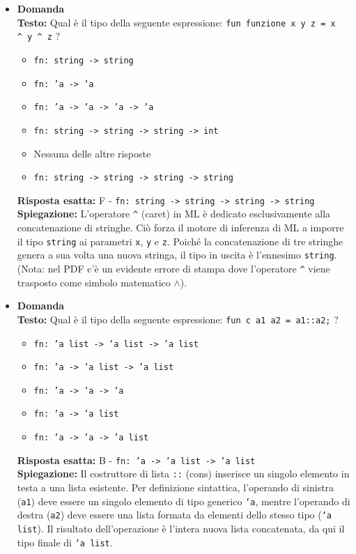 \documentclass[12pt, a4paper]{article}
\newcounter{domandateoria}
\begin{document}
\begin{itemize}
\newpage

    \item {}\textbf{Domanda \thedomandateoria} \\
    \textbf{Testo:} Qual è il tipo della seguente espressione: \texttt{fun funzione x y z = x \textasciicircum\ y \textasciicircum\ z} ?
    \begin{itemize}
        \item[A)] \texttt{fn: string -> string}
        \item[B)] \texttt{fn: 'a -> 'a}
        \item[C)] \texttt{fn: 'a -> 'a -> 'a -> 'a}
        \item[D)] \texttt{fn: string -> string -> string -> int}
        \item[E)] Nessuna delle altre risposte
        \item[F)] \texttt{fn: string -> string -> string -> string}
    \end{itemize}
    \textbf{Risposta esatta:} F - \texttt{fn: string -> string -> string -> string} \\
    \textbf{Spiegazione:} L'operatore \texttt{\textasciicircum} (caret) in ML è dedicato esclusivamente alla concatenazione di stringhe. Ciò forza il motore di inferenza di ML a imporre il tipo \texttt{string} ai parametri \texttt{x}, \texttt{y} e \texttt{z}. Poiché la concatenazione di tre stringhe genera a sua volta una nuova stringa, il tipo in uscita è l'ennesimo \texttt{string}. (Nota: nel PDF c'è un evidente errore di stampa dove l'operatore \texttt{\textasciicircum} viene trasposto come simbolo matematico \texttt{$\wedge$}).
    \vspace{0.3cm}

    \item {}\textbf{Domanda \thedomandateoria} \\
    \textbf{Testo:} Qual è il tipo della seguente espressione: \texttt{fun c a1 a2 = a1::a2;} ?
    \begin{itemize}
        \item[A)] \texttt{fn: 'a list -> 'a list -> 'a list}
        \item[B)] \texttt{fn: 'a -> 'a list -> 'a list}
        \item[C)] \texttt{fn: 'a -> 'a -> 'a}
        \item[D)] \texttt{fn: 'a -> 'a list}
        \item[E)] \texttt{fn: 'a -> 'a -> 'a list}
    \end{itemize}
    \textbf{Risposta esatta:} B - \texttt{fn: 'a -> 'a list -> 'a list} \\
    \textbf{Spiegazione:} Il costruttore di lista \texttt{::} (cons) inserisce un singolo elemento in testa a una lista esistente. Per definizione sintattica, l'operando di sinistra (\texttt{a1}) deve essere un singolo elemento di tipo generico \texttt{'a}, mentre l'operando di destra (\texttt{a2}) deve essere una lista formata da elementi dello stesso tipo (\texttt{'a list}). Il risultato dell'operazione è l'intera nuova lista concatenata, da qui il tipo finale di \texttt{'a list}.
    \vspace{0.3cm}


\end{itemize}
\end{document}
